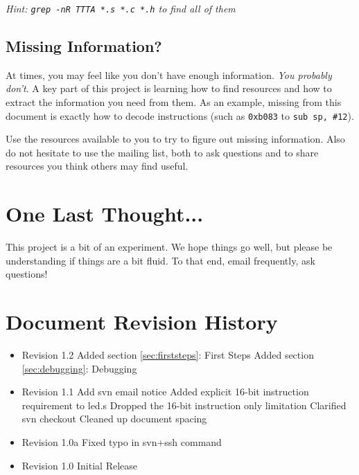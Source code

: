 \documentclass{article}
\begin{document}
\vspace{5mm}

{\em Hint: {\tt grep -nR TTTA *.s *.c *.h} to find all of them}

\subsection{Missing Information?}
\label{sec:missing}
At times, you may feel like you don't have enough information. {\em You
probably don't}. A key part of this project is learning how to find resources
and how to extract the information you need from them. As an example, missing
from this document is exactly how to decode instructions (such as {\tt 0xb083}
to {\tt sub sp, \#12}).

Use the resources available to you to try to figure out missing information.
Also do not hesitate to use the mailing list, both to ask questions and to
share resources you think others may find useful.

\section{One Last Thought...}
This project is a bit of an experiment. We hope things go well, but please be
understanding if things are a bit fluid. To that end, email frequently, ask
questions!

\pagebreak

\section{Document Revision History}

\begin{itemize}

\item Revision 1.2
\subitem Added section \ref{sec:firststeps}: First Steps
\subitem Added section \ref{sec:debugging}: Debugging

\item Revision 1.1
\subitem Add svn email notice
\subitem Added explicit 16-bit instruction requirement to led.s
\subitem Dropped the 16-bit instruction only limitation
\subitem Clarified svn checkout
\subitem Cleaned up document spacing

\item Revision 1.0a
\subitem Fixed typo in svn+ssh command

\item Revision 1.0
\subitem Initial Release

\end{itemize}
\end{document}
